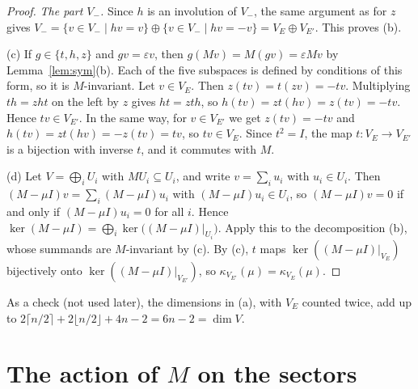 \documentclass[11pt]{amsart}
\theoremstyle{plain}
\theoremstyle{definition}
\theoremstyle{remark}
\numberwithin{equation}{section}
\newcommand{\VE}{V_{E}}
\newcommand{\VEp}{V_{E'}}
\begin{document}
\begin{proof}
\emph{The part \(V_-\).} Since \(h\) is an involution of \(V_-\), the same argument as
for \(z\) gives \(V_-=\{v\in V_-\mid hv=v\}\oplus\{v\in V_-\mid hv=-v\}=\VE\oplus\VEp\).
This proves (b).

(c) If \(g\in\{t,h,z\}\) and \(gv=\varepsilon v\), then \(g(Mv)=M(gv)=\varepsilon Mv\) by
Lemma~\ref{lem:sym}(b). Each of the five subspaces is defined by conditions of this
form, so it is \(M\)-invariant. Let \(v\in\VE\). Then \(z(tv)=t(zv)=-tv\). Multiplying
\(th=zht\) on the left by \(z\) gives \(ht=zth\), so \(h(tv)=zt(hv)=z(tv)=-tv\). Hence
\(tv\in\VEp\). In the same way, for \(v\in\VEp\) we get \(z(tv)=-tv\) and
\(h(tv)=zt(hv)=-z(tv)=tv\), so \(tv\in\VE\). Since \(t^2=I\), the map
\(t\colon\VE\to\VEp\) is a bijection with inverse \(t\), and it commutes with \(M\).

(d) Let \(V=\bigoplus_i U_i\) with \(MU_i\subseteq U_i\), and write \(v=\sum_i u_i\) with
\(u_i\in U_i\). Then \((M-\mu I)v=\sum_i(M-\mu I)u_i\) with \((M-\mu I)u_i\in U_i\), so
\((M-\mu I)v=0\) if and only if \((M-\mu I)u_i=0\) for all \(i\). Hence
\(\ker(M-\mu I)=\bigoplus_i\ker\bigl((M-\mu I)|_{U_i}\bigr)\). Apply this to the
decomposition (b), whose summands are \(M\)-invariant by (c). By (c), \(t\) maps
\(\ker((M-\mu I)|_{\VE})\) bijectively onto \(\ker((M-\mu I)|_{\VEp})\), so
\(\kappa_{\VEp}(\mu)=\kappa_{\VE}(\mu)\).
\end{proof}

As a check (not used later), the dimensions in (a), with \(\VE\) counted twice, add up to
\(2\lceil n/2\rceil+2\lfloor n/2\rfloor+4n-2=6n-2=\dim V\).

\section{The action of \texorpdfstring{\(M\)}{M} on the sectors}\label{sec:action}
\end{document}

